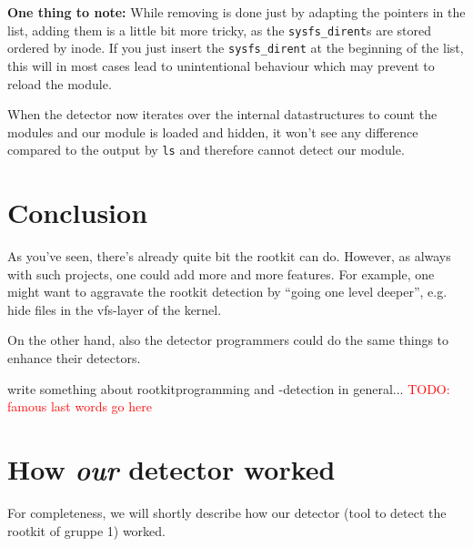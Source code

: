 \documentclass[10pt, letterpaper]{scrartcl}
\newcommand{\todo}[1]{\textcolor{red}{TODO: #1}}
\begin{document}
\textbf{One thing to note:} While removing is done just by adapting the pointers in the list, adding them is a little bit more tricky, as 
the \texttt{sysfs\_dirent}s are stored ordered by inode. If you just insert the \texttt{sysfs\_dirent} at the beginning of the list, this will in most cases lead to unintentional behaviour which may prevent to reload the module.

When the detector now iterates over the internal datastructures to count the modules and our module is loaded and hidden, it won't see any difference compared to the output by \texttt{ls} and therefore cannot detect our module.

\section{Conclusion}

As you've seen, there's already quite bit the rootkit can do. However, as always with such projects, one could add more and more features. For example, one might want to aggravate the rootkit detection by ``going one level deeper'', e.g. hide files in the vfs-layer of the kernel.

On the other hand, also the detector programmers could do the same things to enhance their detectors.



write something about rootkitprogramming and -detection in general...
\todo{famous last words go here}

\appendix{}

\section{How \emph{our} detector worked}
\label{sec:our-detector}

For completeness, we will shortly describe how our detector (tool to detect the rootkit of gruppe 1) worked.
\end{document}
